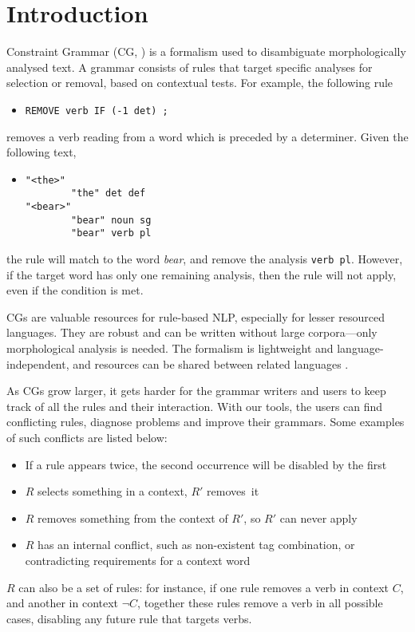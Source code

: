 \section{Introduction}
\label{sec:intro}

Constraint Grammar (CG, \cite{karlsson1995constraint})
is a formalism used to disambiguate morphologically analysed text. 
A grammar consists of rules that target specific analyses for selection or removal, based on contextual tests. For example, the following rule
\begin{itemize}
\item[] \texttt{REMOVE verb IF (-1 det) ;}
\end{itemize}
removes a verb reading from a word which is preceded by a determiner.
Given the following text,
\begin{itemize}
\item[] 
\begin{verbatim}
"<the>"
        "the" det def
"<bear>"
        "bear" noun sg
        "bear" verb pl
\end{verbatim}
\end{itemize}
the rule will match to the word \emph{bear}, and remove the analysis \texttt{verb pl}.
However, if the target word has only one remaining analysis, then the rule will not apply, even if the condition is met.

CGs are valuable resources for rule-based NLP, especially for lesser
resourced languages. They are robust and can be written without large
corpora---only morphological analysis is needed. The formalism is
lightweight and language-independent, and resources can be shared
between related languages \cite{bick2006spanish}.

As CGs grow larger, it gets harder for the grammar writers and users
to keep track of all the rules and their interaction.
With our tools, the users can find conflicting rules, diagnose problems and improve their grammars.
Some examples of such conflicts are listed below:
\begin{itemize}
\item If a rule appears twice, the second occurrence will be disabled by the first
\item $R$ selects something in a context, $R'$ removes~it
\item $R$ removes something from the context of $R'$, so $R'$ can never
  apply
\item $R$ has an internal conflict, such as non-existent
tag combination, or contradicting requirements for a context word
\end{itemize}
$R$ can also be a set of rules: for instance, if one rule removes a verb in
context $C$, and another in context $\neg C$, together these rules
remove a verb in all possible cases, disabling any future rule that
targets verbs.

